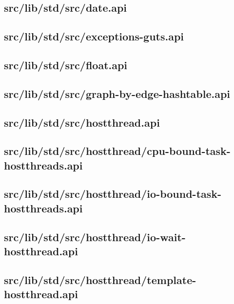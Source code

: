 \subsection{src/lib/std/src/date.api}


\subsection{src/lib/std/src/exceptions-guts.api}


\subsection{src/lib/std/src/float.api}


\subsection{src/lib/std/src/graph-by-edge-hashtable.api}


\subsection{src/lib/std/src/hostthread.api}


\subsection{src/lib/std/src/hostthread/cpu-bound-task-hostthreads.api}


\subsection{src/lib/std/src/hostthread/io-bound-task-hostthreads.api}


\subsection{src/lib/std/src/hostthread/io-wait-hostthread.api}


\subsection{src/lib/std/src/hostthread/template-hostthread.api}


